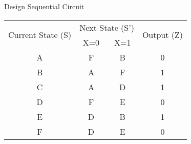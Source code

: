 \documentclass{vhdl-assignment}
\begin{document}
\begin{problem}{Design Sequential Circuit}
    \begin{center}
        \begin{tabular}{|c|cc|c|}
            \hline
            \multirow{2}{*}{Current State (S)} & \multicolumn{2}{c|}{Next State (S')} & \multirow{2}{*}{Output (Z)}     \\ \cline{2-3}
                                               & \multicolumn{1}{c|}{X=0}             & X=1                         &   \\ \hline
            A                                  & \multicolumn{1}{c|}{F  }             & B                           & 0 \\ \hline
            B                                  & \multicolumn{1}{c|}{A  }             & F                           & 1 \\ \hline
            C                                  & \multicolumn{1}{c|}{A  }             & D                           & 1 \\ \hline
            D                                  & \multicolumn{1}{c|}{F  }             & E                           & 0 \\ \hline
            E                                  & \multicolumn{1}{c|}{D  }             & B                           & 1 \\ \hline
            F                                  & \multicolumn{1}{c|}{D  }             & E                           & 0 \\ \hline
        \end{tabular}
    \end{center}
\end{problem}
\end{document}
